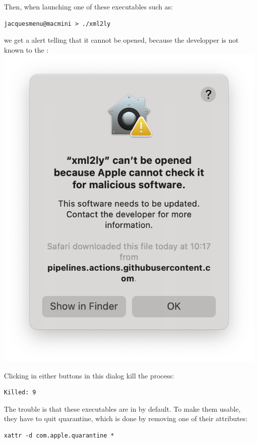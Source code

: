 Then, when launching one of these executables such as:
\begin{lstlisting}[language=Terminal]
jacquesmenu@macmini > ./xml2ly 
\end{lstlisting}
we get a alert telling that it cannot be opened, because the developper is not known to the \OS:\\
\includegraphics[scale=0.5]{../graphics/MacOSMaliciousSoftwareAlert.png}

Clicking in either buttons in this dialog kill the process:
\begin{lstlisting}[language=Terminal]
Killed: 9
\end{lstlisting}

The trouble is that these executables are in {\it \quarantine} by default. To make them usable, they have to quit quarantine, which is done by removing one of their attributes:
\begin{lstlisting}[language=Terminal]
xattr -d com.apple.quarantine *
\end{lstlisting}

